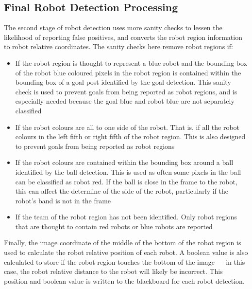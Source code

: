 \documentclass[pdftex,11pt,a4paper]{report}
\begin{document}
\subsection{Final Robot Detection Processing}
The second stage of robot detection uses more sanity checks to lessen the likelihood of reporting false positives, and converts the robot region information to robot relative coordinates. The sanity checks here remove robot regions if: \begin{itemize}
\item{If the robot region is thought to represent a blue robot and the bounding box of the robot blue coloured pixels in the robot region is contained within the bounding box of a goal post identified by the goal detection. This sanity check is used to prevent goals from being reported as robot regions, and is especially needed because the goal blue and robot blue are not separately classified}
\item{If the robot colours are all to one side of the robot. That is, if all the robot colours in the left fifth or right fifth of the robot region. This is also designed to prevent goals from being reported as robot regions}
\item{If the robot colours are contained within the bounding box around a ball identified by the ball detection. This is used as often some pixels in the ball can be classified as robot red. If the ball is close in the frame to the robot, this can affect the determine of the side of the robot, particularly if the robot's band is not in the frame}
\item{If the team of the robot region has not been identified. Only robot regions that are thought to contain red robots or blue robots are reported}
\end{itemize}
Finally, the image coordinate of the middle of the bottom of the robot region is used to calculate the robot relative position of each robot. A boolean value is also calculated to store if the robot region touches the bottom of the image --- in this case, the robot relative distance to the robot will likely be incorrect. This position and boolean value is written to the blackboard for each robot detection.
\end{document}
